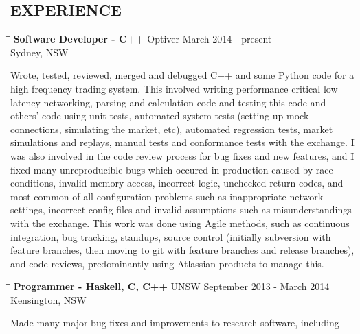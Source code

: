 \documentclass{res}
\begin{document}
\begin{resume}
\section{EXPERIENCE}
   \vspace{-0.1in}	
   \begin{tabbing}
   \hspace{2.3in}\= \hspace{2.6in}\= \kill %
    {\bf Software Developer - C++} \>Optiver \>March 2014 - present\\
                                   \>Sydney, NSW
   \end{tabbing}\vspace{-20pt}      %
    Wrote, tested, reviewed, merged and debugged C++ and some Python code for a
    high frequency trading system. This involved writing performance critical
    low latency networking, parsing and calculation code and testing this code
    and others' code using unit tests, automated system tests (setting up mock
    connections, simulating the market, etc), automated regression tests,
    market simulations and replays, manual tests and conformance tests with the
    exchange. I was also involved in the code review process for bug fixes and
    new features, and I fixed many unreproducible bugs which occured in
    production caused by race conditions, invalid memory access, incorrect
    logic, unchecked return codes, and most common of all configuration
    problems such as inappropriate network settings, incorrect config files and
    invalid assumptions such as misunderstandings with the exchange. This work
    was done using Agile methods, such as continuous integration, bug tracking,
    standups, source control (initially subversion with feature branches, then
    moving to git with feature branches and release branches), and code
    reviews, predominantly using Atlassian products to manage this.
   \begin{tabbing}
   \hspace{2.3in}\= \hspace{2.6in}\= \kill %
    {\bf Programmer - Haskell, C, C++} \>UNSW \>September 2013 - March 2014\\
                                       \>Kensington, NSW
   \end{tabbing}\vspace{-20pt}      %
    Made many major bug fixes and improvements to research software, including

\end{resume}
\end{document}
